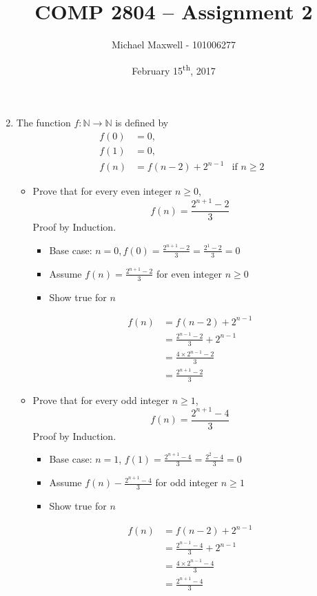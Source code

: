\documentclass{article}
\title{COMP 2804 -- Assignment 2}
\author{Michael Maxwell - 101006277}
\date{February 15\textsuperscript{th}, 2017}
\newcommand{\IN}{\mathbb{N}}
\begin{document}
	\maketitle

	\begin{enumerate}
		\setcounter{enumi}{1}
		\item %
			The function $f : \IN \rightarrow \IN$ is defined by 
			\begin{align*}
				f(0) &= 0, \\
				f(1) &= 0, \\
				f(n) &= f(n - 2) + 2^{n - 1} & \mbox{if $n \geq 2$}
			\end{align*}
		
			\begin{itemize}
				\item
					Prove that for every even integer $n \geq 0$, \\
					\[
						f(n) = \frac{2^{n + 1} - 2}{3}
					\]
					Proof by Induction. \\
					\begin{itemize}
						\item Base case: $n = 0, f(0) =\frac{2^{n + 1} - 2}{3} = \frac{2^1 - 2}{3} = 0$
						\item Assume $f(n) = \frac{2^{n + 1} - 2}{3}$ for even integer $n \geq 0$
						\item Show true for $n$
					\end{itemize}
					\begin{align*}
						f(n) &= f(n - 2) + 2^{n - 1} \\
						&= \frac{2^{n - 1} - 2}{3} + 2^{n - 1} \\
						&= \frac{4 \times 2^{n - 1} - 2}{3} \\
						&= \frac{2^{n + 1} - 2}{3}
					\end{align*}
				\item
					Prove that for every odd integer $n \geq 1$, \\
					\[
						f(n) = \frac{2^{n + 1} - 4}{3}
					\]
					Proof by Induction. \\
					\begin{itemize}
						\item Base case: $n = 1$, $f(1) =  \frac{2^{n + 1} - 4}{3} = \frac{2^2 - 4}{3} = 0$
						\item Assume $f(n) - \frac{2^{n + 1} - 4}{3}$ for odd integer $n \geq 1$
						\item Show true for $n$
					\end{itemize}
					\begin{align*}
						f(n) &= f(n - 2) + 2^{n - 1} \\
						&=\frac{2^{n - 1} - 4}{3} + 2^{n - 1} \\
						&=\frac{4 \times 2^{n - 1} - 4}{3} \\
						&=\frac{2^{n + 1} - 4}{3}
					\end{align*}
			\end{itemize}
			

\end{enumerate}
\end{document}

